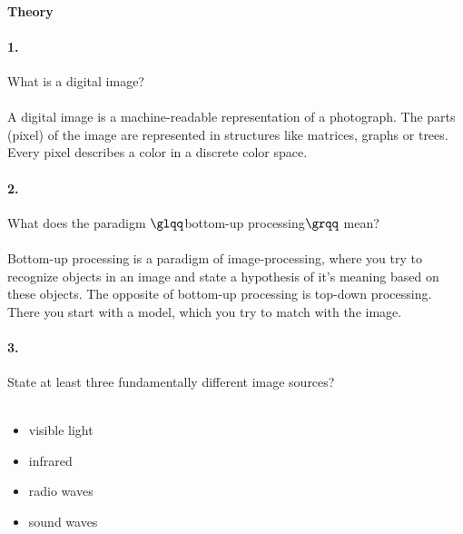 \paragraph{Theory}
\paragraph{1.} What is a digital image? \\ \\
A digital image is a machine-readable representation of a photograph. The parts (pixel) of the image are represented in structures like matrices, graphs or trees. Every pixel describes a color in a discrete color space.
\paragraph{2.} What does the paradigm $\glqq$bottom-up processing$\grqq$ mean? \\ \\
Bottom-up processing is a paradigm of image-processing, where you try to recognize objects in an image and state a hypothesis of it's meaning based on these objects. The opposite of bottom-up processing is top-down processing. There you start with a model, which you try to match with the image.
\paragraph{3.} State at least three fundamentally different image sources? \\ \\ %
\begin{itemize}
\item visible light
\item infrared
\item radio waves
\item sound waves
\end{itemize}
